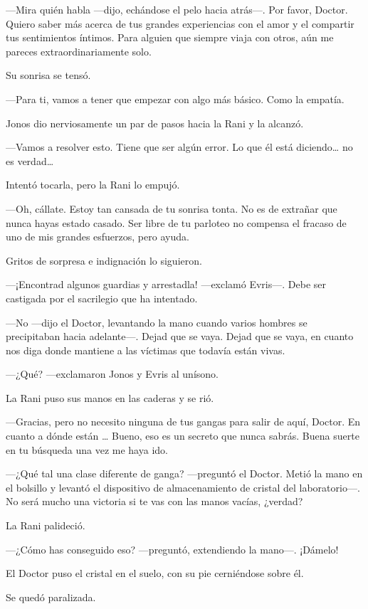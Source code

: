 ---Mira quién habla ---dijo, echándose el pelo hacia atrás---. Por
favor, Doctor. Quiero saber más acerca de tus grandes experiencias con
el amor y el compartir tus sentimientos íntimos. Para alguien que
siempre viaja con otros, aún me pareces extraordinariamente solo.

Su sonrisa se tensó.

---Para ti, vamos a tener que empezar con algo más básico. Como la
empatía.

Jonos dio nerviosamente un par de pasos hacia la Rani y la alcanzó.

---Vamos a resolver esto. Tiene que ser algún error. Lo que él está
diciendo\ldots{} no es verdad\ldots{}

Intentó tocarla, pero la Rani lo empujó.

---Oh, cállate. Estoy tan cansada de tu sonrisa tonta. No es de extrañar
que nunca hayas estado casado. Ser libre de tu parloteo no compensa el
fracaso de uno de mis grandes esfuerzos, pero ayuda.

Gritos de sorpresa e indignación lo siguieron.

---¡Encontrad algunos guardias y arrestadla! ---exclamó Evris---. Debe
ser castigada por el sacrilegio que ha intentado.

---No ---dijo el Doctor, levantando la mano cuando varios hombres se
precipitaban hacia adelante---. Dejad que se vaya. Dejad que se vaya, en
cuanto nos diga donde mantiene a las víctimas que todavía están vivas.

---¿Qué? ---exclamaron Jonos y Evris al unísono.

La Rani puso sus manos en las caderas y se rió.

---Gracias, pero no necesito ninguna de tus gangas para salir de aquí,
Doctor. En cuanto a dónde están \ldots{} Bueno, eso es un secreto que
nunca sabrás. Buena suerte en tu búsqueda una vez me haya ido.

---¿Qué tal una clase diferente de ganga? ---preguntó el Doctor. Metió
la mano en el bolsillo y levantó el dispositivo de almacenamiento de
cristal del laboratorio---. No será mucho una victoria si te vas con las
manos vacías, ¿verdad?

La Rani palideció.

---¿Cómo has conseguido eso? ---preguntó, extendiendo la mano---.
¡Dámelo!

El Doctor puso el cristal en el suelo, con su pie cerniéndose sobre él.

Se quedó paralizada.

